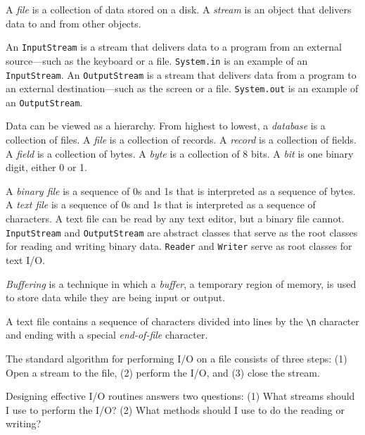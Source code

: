 \label{summaryof-important-points}
\begin{SMBLlarge}
\item  A {\it file} is a collection of data stored on a disk.
A {\it stream} is an object that delivers data to and from other
objects.  

\item An {\tt InputStream} is a stream that delivers data to a
program from an external source---such as the keyboard or a file.
{\tt System.in} is an example of an {\tt InputStream}. An
{\tt OutputStream} is a stream that delivers data from a program to an
external destination---such as the screen or a file.   {\tt System.out} is
an example of an {\tt OutputStream}.

\item  Data can be viewed as a hierarchy.  From highest to
lowest, a {\it database} is a collection of files.  A {\it file} is a
collection of records.  A {\it record} is a collection of fields.   A
{\it field} is a collection of bytes.  A {\it byte} is a collection of
8 bits.   A {\it bit} is one binary digit, either 0 or 1.

\item  A {\it binary file} is a sequence of 0s and 1s that
is interpreted as a sequence of bytes.  A {\it text file} is a sequence
of 0s and 1s that is interpreted as a sequence of characters.  A text
file can be read by any text editor, but a binary file cannot.
{\tt InputStream} and {\tt OutputStream} are abstract classes that
serve as the root classes for reading and writing binary data.   {\tt Reader}
and {\tt Writer} serve as root classes for text I/O.

\item  {\it Buffering} is a technique in which a {\it buffer}, a temporary
region of memory, is used to store data while they are being input or
output.

\item  A text file contains a sequence of characters divided into
lines by the \verb|\n| character and ending with a special
{\it end-of-file} character.

\item  The standard algorithm for performing I/O on a file consists
of three steps: (1) Open a stream to the file, (2) perform the
I/O, and (3) close the stream.


\item  Designing effective I/O routines answers
two questions: (1) What streams should I use to perform
the I/O? (2) What methods should I use to do the reading
or writing?


\end{SMBLlarge}
